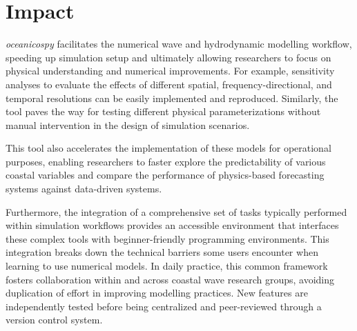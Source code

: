 \documentclass[preprint,12pt, a4paper]{elsarticle}
\begin{document}
\section{Impact}

\textit{oceanicospy} facilitates the numerical wave and hydrodynamic modelling workflow, speeding up simulation setup and ultimately allowing researchers to focus on physical understanding and numerical improvements. For example, sensitivity analyses to evaluate the effects of different spatial, frequency-directional, and temporal resolutions can be easily implemented and reproduced. Similarly, the tool paves the way for testing different physical parameterizations without manual intervention in the design of simulation scenarios.

This tool also accelerates the implementation of these models for operational purposes, enabling researchers to faster explore the predictability of various coastal variables and compare the performance of physics-based forecasting systems against data-driven systems.

Furthermore, the integration of a comprehensive set of tasks typically performed within simulation workflows provides an accessible environment that interfaces these complex tools with beginner-friendly programming environments. This integration breaks down the technical barriers some users encounter when learning to use numerical models. In daily practice, this common framework fosters collaboration within and across coastal wave research groups, avoiding duplication of effort in improving modelling practices. New features are independently tested before being centralized and peer-reviewed through a version control system.
\end{document}
